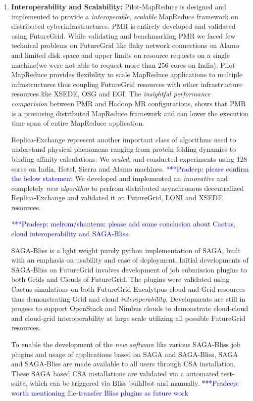 \documentclass[]{paper}
\newcommand{\pmnote}[1]{ {\textcolor{blue} { ***Pradeep: #1 }}}
\newcommand{\pmnote}[1]{}
\begin{document}
\begin{enumerate}
\item \textbf{Interoperability and Scalability: }
Pilot-MapReduce is designed  and implemented to provide a \textit{interoperable},  \textit{scalable} MapReduce framework on distributed cyberinfrastructures. PMR is entirely developed and validated using FutureGrid.  While validating and benchmarking PMR we faced few technical problems on FutureGrid like flaky network connections on Alamo and limited disk space and upper limits on resource requests on a single machine(we were not able to request more than 256 cores on India). Pilot-MapReduce provides flexibility to scale MapReduce applications to multiple infrastructures thus coupling FutureGrid resources with other infrastructure resources like XSEDE, OSG and EGI.  The \textit{insightful performance comparision} between PMR and Hadoop MR configurations, shows that PMR is a promising distributed MapReduce framework and can lower the execution time span of entire MapReduce application.

Replica-Exchange represent another important class of algorithms  used to understand physical phenomena ranging from protein folding dynamics to binding affinity calculations. We \textit{scaled},  and conducted experiments using 128 cores on India, Hotel, Sierra and Alamo machines.\pmnote{please confirm the below statement} We developed and implemented an \textit{innovative} and completely \textit{new algorithm} to perfrom distributed asynchronous decentralized Replica-Exchange and validated it on FutureGrid, LONI and XSEDE resources.

\pmnote{melrom/shantenu: please add some conclusion about Cactus, cloud interoperability and SAGA-Bliss.}

SAGA-Bliss is a light weight purely python implementation of SAGA, built with an emphasis on usability and ease of deployment. Initial developments of SAGA-Bliss on FutureGrid involves development of job submission plugins to both Grids and Clouds of FutureGrid. The plugins were validated using Cactus simulations on both FutureGrid Eucalytpus cloud and Grid resources thus demonstrating Grid and cloud \textit{interoperability}. Developments are still in progess to support OpenStack and Nimbus clouds to demonstrate cloud-cloud and cloud-grid interoperability at large scale utilizing all possible FutureGrid resources. 

To enable the development of the \textit{new software} like various SAGA-Bliss job plugins and usage of applications based on SAGA and SAGA-Bliss, SAGA and SAGA-Bliss are made available to all users through CSA installation. These SAGA based CSA installations are validated via a automated test-suite, which can be triggered via Bliss buildbot and manually. \pmnote{ worth mentioning file-transfer Bliss plugins as future work}


\end{enumerate}
\end{document}

